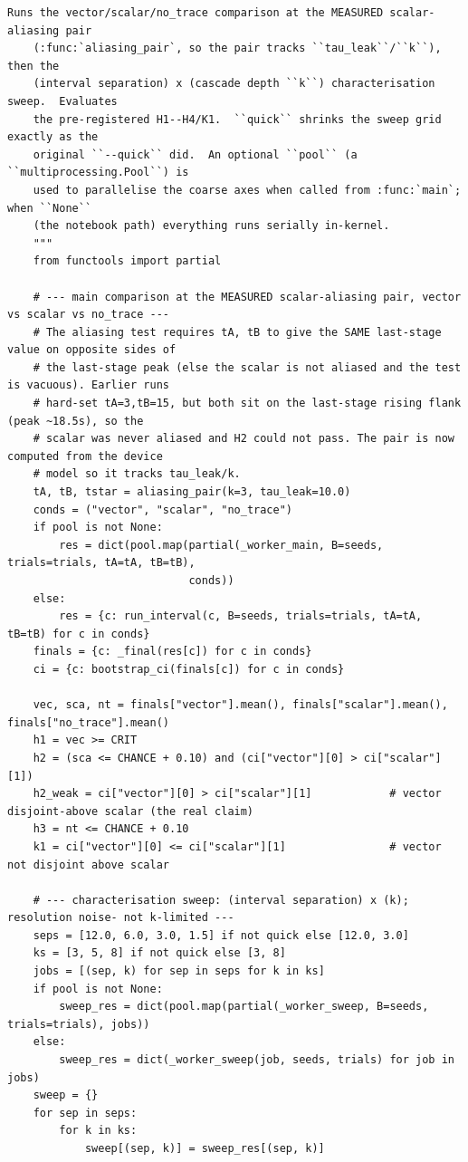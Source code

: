 \begin{lstlisting}[caption={mrl\_trace/selectivity.py},label={lst:siox-src-selectivity}]
    Runs the vector/scalar/no_trace comparison at the MEASURED scalar-aliasing pair
    (:func:`aliasing_pair`, so the pair tracks ``tau_leak``/``k``), then the
    (interval separation) x (cascade depth ``k``) characterisation sweep.  Evaluates
    the pre-registered H1--H4/K1.  ``quick`` shrinks the sweep grid exactly as the
    original ``--quick`` did.  An optional ``pool`` (a ``multiprocessing.Pool``) is
    used to parallelise the coarse axes when called from :func:`main`; when ``None``
    (the notebook path) everything runs serially in-kernel.
    """
    from functools import partial

    # --- main comparison at the MEASURED scalar-aliasing pair, vector vs scalar vs no_trace ---
    # The aliasing test requires tA, tB to give the SAME last-stage value on opposite sides of
    # the last-stage peak (else the scalar is not aliased and the test is vacuous). Earlier runs
    # hard-set tA=3,tB=15, but both sit on the last-stage rising flank (peak ~18.5s), so the
    # scalar was never aliased and H2 could not pass. The pair is now computed from the device
    # model so it tracks tau_leak/k.
    tA, tB, tstar = aliasing_pair(k=3, tau_leak=10.0)
    conds = ("vector", "scalar", "no_trace")
    if pool is not None:
        res = dict(pool.map(partial(_worker_main, B=seeds, trials=trials, tA=tA, tB=tB),
                            conds))
    else:
        res = {c: run_interval(c, B=seeds, trials=trials, tA=tA, tB=tB) for c in conds}
    finals = {c: _final(res[c]) for c in conds}
    ci = {c: bootstrap_ci(finals[c]) for c in conds}

    vec, sca, nt = finals["vector"].mean(), finals["scalar"].mean(), finals["no_trace"].mean()
    h1 = vec >= CRIT
    h2 = (sca <= CHANCE + 0.10) and (ci["vector"][0] > ci["scalar"][1])
    h2_weak = ci["vector"][0] > ci["scalar"][1]            # vector disjoint-above scalar (the real claim)
    h3 = nt <= CHANCE + 0.10
    k1 = ci["vector"][0] <= ci["scalar"][1]                # vector not disjoint above scalar

    # --- characterisation sweep: (interval separation) x (k); resolution noise- not k-limited ---
    seps = [12.0, 6.0, 3.0, 1.5] if not quick else [12.0, 3.0]
    ks = [3, 5, 8] if not quick else [3, 8]
    jobs = [(sep, k) for sep in seps for k in ks]
    if pool is not None:
        sweep_res = dict(pool.map(partial(_worker_sweep, B=seeds, trials=trials), jobs))
    else:
        sweep_res = dict(_worker_sweep(job, seeds, trials) for job in jobs)
    sweep = {}
    for sep in seps:
        for k in ks:
            sweep[(sep, k)] = sweep_res[(sep, k)]


\end{lstlisting}
